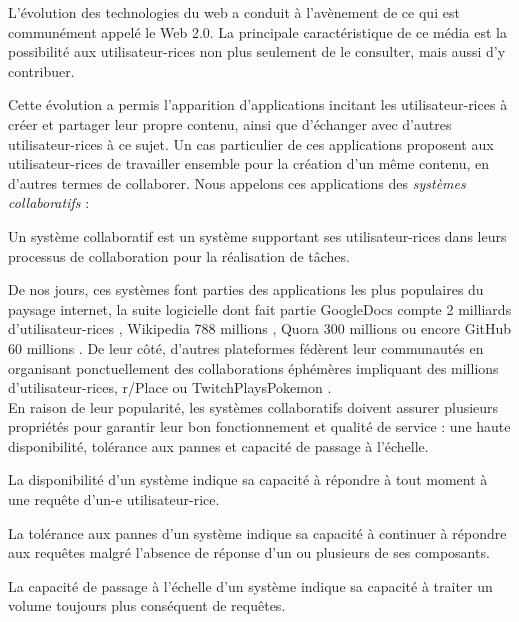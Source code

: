 \label{sec:intro-contexte}

L'évolution des technologies du web a conduit à l'avènement de ce qui est communément appelé le Web 2.0.
La principale caractéristique de ce média est la possibilité aux utilisateur-rices non plus seulement de le consulter, mais aussi d'y contribuer.

Cette évolution a permis l'apparition d'applications incitant les utilisateur-rices à créer et partager leur propre contenu, ainsi que d'échanger avec d'autres utilisateur-rices à ce sujet.
Un cas particulier de ces applications proposent aux utilisateur-rices de travailler ensemble pour la création d'un même contenu, en d'autres termes de collaborer.
Nous appelons ces applications des \emph{systèmes collaboratifs} :
\begin{definition}
  \label{def:collaborative-system}
  Un système collaboratif est un système supportant ses utilisateur-rices dans leurs processus de collaboration pour la réalisation de tâches.
\end{definition}

De nos jours, ces systèmes font parties des applications les plus populaires du paysage internet, \eg la suite logicielle dont fait partie GoogleDocs compte 2 milliards d'utilisateur-rices \cite{2020-google-g-suite-users}, Wikipedia 788 millions \cite{2022-09-monthly-active-users-wikipedia}, Quora 300 millions \cite{2022-01-monthly-active-users-social-networks} ou encore GitHub 60 millions \cite{2022-github-users}.
De leur côté, d'autres plateformes fédèrent leur communautés en organisant ponctuellement des collaborations éphémères impliquant des millions d'utilisateur-rices, \eg r/Place \cite{2022-rplace} ou TwitchPlaysPokemon \cite{2014-twitch-plays-pokemon}.\\

En raison de leur popularité, les systèmes collaboratifs doivent assurer plusieurs propriétés pour garantir leur bon fonctionnement et qualité de service : une haute disponibilité, tolérance aux pannes et capacité de passage à l'échelle.
\begin{definition}[Disponibilité]
  \label{def:availability}
  La disponibilité d'un système indique sa capacité à répondre à tout moment à une requête d'un-e utilisateur-rice.
\end{definition}
\begin{definition}
  La tolérance aux pannes d'un système indique sa capacité à continuer à répondre aux requêtes malgré l'absence de réponse d'un ou plusieurs de ses composants.
\end{definition}
\begin{definition}
  \label{def:scalability-intro}
  La capacité de passage à l'échelle d'un système indique sa capacité à traiter un volume toujours plus conséquent de requêtes.
\end{definition}

